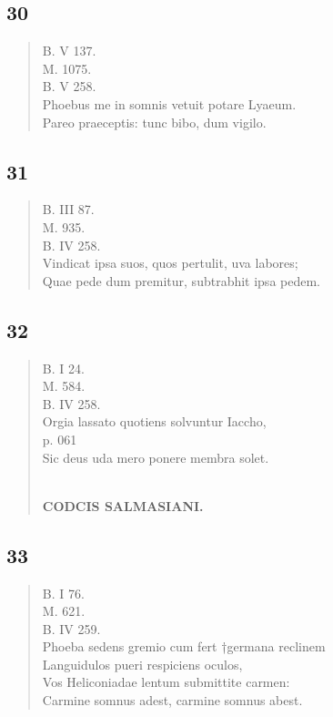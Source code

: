 \documentclass[11pt, a4paper]{report}
\begin{document}
            \subsection*{30}
      \begin{verse}
      B. V 137. \\ M. 1075. \\ B. V 258. \\ Phoebus me in somnis vetuit potare Lyaeum. \\ Pareo praeceptis: tunc bibo, dum vigilo. \\ 
      \end{verse}
  
            \subsection*{31}
      \begin{verse}
      B. III 87. \\ M. 935. \\ B. IV 258. \\ Vindicat ipsa suos, quos pertulit, uva labores; \\ Quae pede dum premitur, subtrabhit ipsa pedem. \\ 
      \end{verse}
  
            \subsection*{32}
      \begin{verse}
      B. I 24. \\ M. 584. \\ B. IV 258. \\ Orgia lassato quotiens solvuntur Iaccho, \\ p. 061 \\ Sic deus uda mero ponere membra solet. \\ 
        ﻿\pagebreak 
    \begin{center} \textbf{CODCIS SALMASIANI.} \end{center} \marginpar{[101]} 
      \end{verse}
  
            \subsection*{33}
      \begin{verse}
      B. I 76. \\ M. 621. \\ B. IV 259. \\ Phoeba sedens gremio cum fert †germana reclinem \\ Languidulos pueri respiciens oculos, \\ Vos Heliconiadae lentum submittite carmen: \\ Carmine somnus adest, carmine somnus abest. \\ 
      \end{verse}
  
\end{document}
